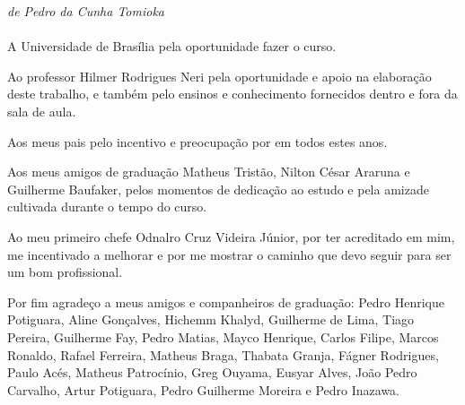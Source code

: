 \begin{agradecimentos}

\emph{de Pedro da Cunha Tomioka} \\ \\

A Universidade de Brasília pela oportunidade fazer o curso.

Ao professor Hilmer Rodrigues Neri pela oportunidade e apoio na elaboração deste trabalho, e também pelo ensinos e conhecimento fornecidos dentro e fora da sala de aula.

Aos meus pais pelo incentivo e preocupação por em todos estes anos.

Aos meus amigos de graduação Matheus Tristão, Nilton César Araruna e Guilherme Baufaker, pelos momentos de dedicação ao estudo e pela amizade cultivada durante o tempo do curso.

Ao meu primeiro chefe Odnalro Cruz Videira Júnior, por ter acreditado em mim, me incentivado a melhorar e por me mostrar o caminho que devo seguir para ser um bom profissional.

Por fim agradeço a meus amigos e companheiros de graduação: Pedro Henrique Potiguara, Aline Gonçalves, Hichemm Khalyd, Guilherme de Lima,  Tiago Pereira, Guilherme Fay, Pedro Matias, Mayco Henrique, Carlos Filipe, Marcos Ronaldo, Rafael Ferreira, Matheus Braga, Thabata Granja, Fágner Rodrigues, Paulo Acés, Matheus Patrocínio, Greg Ouyama, Eusyar Alves, João Pedro Carvalho, Artur Potiguara, Pedro Guilherme Moreira e Pedro Inazawa.


\end{agradecimentos}
